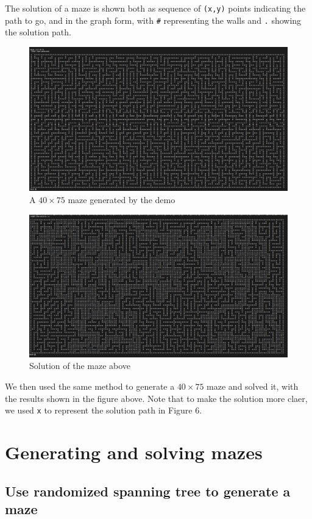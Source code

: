 \documentclass[cn,black,12pt,normal]{elegantnote}
\begin{document}
The solution of a maze is shown both as sequence of \lstinline{(x,y)} points indicating the path to go, and in the graph form, with \lstinline{#} representing the walls and \lstinline{.} showing the solution path.

\begin{figure}[H]
    \centering
    \includegraphics[width=0.9\linewidth]{image/m04.jpg}
    \caption{A $40 \times 75$ maze generated by the demo}
\end{figure}
\begin{figure}[H]
    \centering
    \includegraphics[width=0.9\linewidth]{image/m05.jpg}
    \caption{Solution of the maze above}
\end{figure}

We then used the same method to generate a $40 \times 75$ maze and solved it, with the results shown in the figure above. Note that to make the solution more claer, we used \lstinline{x} to represent the solution path in Figure 6.

\section{Generating and solving mazes}

\subsection{Use randomized spanning tree to generate a maze}
\end{document}
